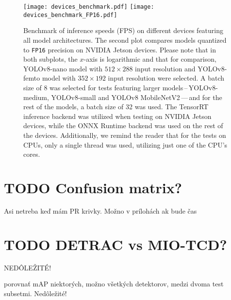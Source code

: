 \begin{figure}[H]
    \begin{framed}
        \centering
        \texttt{[image: devices\_benchmark.pdf]}
        \texttt{[image: devices\_benchmark\_FP16.pdf]}
        \caption{Benchmark of inference speeds (FPS) on different devices
        featuring all model architectures. The second plot compares models
        quantized to \texttt{FP16} precision on NVIDIA Jetson devices. Please
        note that in both subplots, the $x$-axis is logarithmic and that for
        comparison, YOLOv8-nano model with $512 \times 288$ input resolution and
        YOLOv8-femto model with $352 \times 192$ input resolution were selected.
        A batch size of 8 was selected for tests featuring larger
        models\,--\,YOLOv8-medium, YOLOv8-small and YOLOv8 MobileNetV2\,---\,and for
        the rest of the models, a batch size of 32 was used. The TensorRT
        inference backend was utilized when testing on NVIDIA Jetson devices,
        while the ONNX Runtime backend was used on the rest of the devices.
        Additionally, we remind the reader that for the tests on CPUs, only a
        single thread was used, utilizing just one of the CPU's cores.}
        \label{DevicesBenchmark}
    \end{framed}
\end{figure}








\section{TODO Confusion matrix?}

Asi netreba keď mám PR krivky. Možno v prílohách ak bude čas




\section{TODO DETRAC vs MIO-TCD?}

NEDÔLEŽITÉ!

porovnať mAP niektorých, možno všetkých detektorov, medzi dvoma test subsetmi. Nedôležité!

